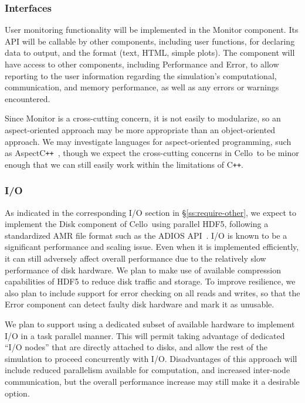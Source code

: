 \documentclass[11pt,letterpaper]{article}
\newcommand{\cello}{\textsf{Cello}}
\newcommand{\pp}{\texttt{++}}
\newcommand{\cpp}{C\pp}
\newcommand{\code}[1]{\textsf{#1}}
\begin{document}
\subsubsection{Interfaces} \label{sss:design-interfaces}

User monitoring functionality will be implemented in the
\code{Monitor} component.  Its API will be callable by other
components, including user functions, for declaring data to output,
and the format (text, HTML, simple plots).  The component will have
access to other components, including \code{Performance} and
\code{Error}, to allow reporting to the user information regarding the
simulation's computational, communication, and memory performance, as
well as any errors or warnings encountered.

Since \code{Monitor} is a cross-cutting concern, it is not easily
to modularize, so an aspect-oriented approach may be more appropriate
than an object-oriented approach.  We may investigate languages for
aspect-oriented programming, such as
\code{Aspect\cpp}~\cite{wwwaspectcpp}, though we expect the cross-cutting
concerns in \cello\ to be minor enough that we can still easily work
within the limitations of \cpp.

\subsubsection{I/O} \label{sss:design-io}

As indicated in the corresponding I/O section in
\S\ref{ss:require-other}, we expect to implement the \code{Disk}
component of \cello\ using parallel HDF5, following a standardized AMR
file format such as the ADIOS API~\cite{LoKl08}.  I/O is known to be a
significant performance and scaling issue.  Even when it is
implemented efficiently, it can still adversely affect overall
performance due to the relatively slow performance of disk hardware.
We plan to make use of available compression capabilities of HDF5 to
reduce disk traffic and storage.  To improve resilience, we also plan
to include support for error checking on all reads and writes, so that
the \code{Error} component can detect faulty disk hardware and mark it
as unusable.

We plan to support using a dedicated subset of available hardware to
implement I/O in a task parallel manner.  This will permit taking
advantage of dedicated ``I/O nodes'' that are directly attached to
disks, and allow the rest of the simulation to proceed concurrently
with I/O.  Disadvantages of this approach will include reduced
parallelism available for computation, and increased inter-node
communication, but the overall performance increase may still make it
a desirable option.
\end{document}
